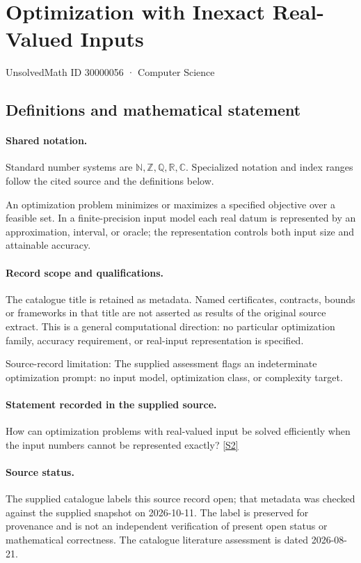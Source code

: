 \documentclass[11pt]{article}
\newcommand{\sref}[2]{\hyperlink{source:#1:#2}{[S#2]}}
\begin{document}
\setcounter{section}{30000055}
\section{Optimization with Inexact Real-Valued Inputs}\label{30000056}
{\small\sffamily UnsolvedMath ID 30000056 · Computer Science}
\subsection{Definitions and mathematical statement}

\paragraph{Shared notation.}Standard number systems are $\mathbb N,\mathbb Z,\mathbb Q,\mathbb R,\mathbb C$. Specialized notation and index ranges follow the cited source and the definitions below.


An optimization problem minimizes or maximizes a specified objective over a feasible set. In a finite-precision input model each real datum is represented by an approximation, interval, or oracle; the representation controls both input size and attainable accuracy.
\paragraph{Record scope and qualifications.}
The catalogue title is retained as metadata. Named certificates, contracts, bounds or frameworks in that title are not asserted as results of the original source extract.
This is a general computational direction: no particular optimization family, accuracy requirement, or real-input representation is specified.

Source-record limitation: The supplied assessment flags an indeterminate optimization prompt: no input model, optimization class, or complexity target.
\paragraph{Statement recorded in the supplied source.}
How can optimization problems with real-valued input be solved efficiently when the input numbers cannot be represented exactly? \sref{30000056}{2}
\paragraph{Source status.}
The supplied catalogue labels this source record open; that metadata was checked against the supplied snapshot on 2026-10-11. The label is preserved for provenance and is not an independent verification of present open status or mathematical correctness. The catalogue literature assessment is dated 2026-08-21.
\end{document}
